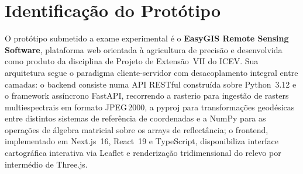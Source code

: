 \documentclass[10pt, a4paper, twocolumn]{article}
\begin{document}

\footnotesize

\section{Identificação do Protótipo}

O protótipo submetido a exame experimental é o \textbf{EasyGIS Remote Sensing Software}, plataforma web orientada à agricultura de precisão e desenvolvida como produto da disciplina de Projeto de Extensão~VII do ICEV. Sua arquitetura segue o paradigma cliente-servidor com desacoplamento integral entre camadas: o backend consiste numa API RESTful construída sobre Python~3.12 e o framework assíncrono FastAPI, recorrendo a rasterio para ingestão de rasters multiespectrais em formato JPEG\,2000, a pyproj para transformações geodésicas entre distintos sistemas de referência de coordenadas e a NumPy para as operações de álgebra matricial sobre os arrays de reflectância; o frontend, implementado em Next.js~16, React~19 e TypeScript, disponibiliza interface cartográfica interativa via Leaflet e renderização tridimensional do relevo por intermédio de Three.js.
\end{document}
